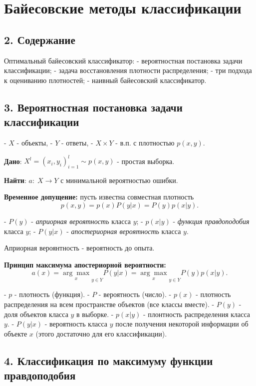 \section{Байесовские методы классификации}

\subsection{2. Содержание}

Оптимальный байесовский классификатор:
- вероятностная постановка задачи классификации;
- задача восстановления плотности распределения;
- три подхода к оцениванию плотностей;
- наивный байесовский классификатор.

\subsection{3. Вероятностная постановка задачи классификации}

- $X$ - объекты,
- $Y$ - ответы,
- $X \times Y$ - в.п. с плотностью $p{(x, y)}$.

\textbf{Дано}: $X^l = {(x_i, y_i)}_{i=1}^{l} \sim p{(x, y)}$ - простая
выборка.

\textbf{Найти}: $a: \; X \rightarrow Y$ с минимальной вероятностью ошибки.

\textbf{Временное допущение:} пусть известна совместная плотность
$$p{(x, y)} = p{(x)} P{(y \vert x)} = P{(y)} p{(x \vert y)}.$$

- $P{(y)}$ - \textit{априорная вероятность} класса $y$;
- $p{(x \vert y)}$ - \textit{функция правдоподобия} класса $y$;
- $P{(y \vert x)}$ - \textit{апостериорная вероятность} класса $y$.

Априорная вероянтность - вероятность до опыта.

\textbf{Принцип максимума апостериорной вероятности:}
$$a{(x)} = {\underset{x}{\arg\max}}_{y \in Y}{P{(y \vert x)}} = {\underset{x}{\arg\max}}_{y \in Y}{P{(y)} p{(x \vert y)}}.$$

- $p$ - плотность (функция).
- $P$ - вероятность (число).
- $p{(x)}$ - плотность распределения на всем пространстве объектов
(все классы вместе).
- $P{(y)}$ - доля объектов класса $y$ в выборке.
- $p{(x \vert y)}$ - плонтность распределения класса $y$.
- $P{(y \vert x)}$ - вероятность класса $y$ после получения некоторой
информации об объекте $x$ (этого достаточно для его классификации).

\subsection{4. Классификация по максимуму функции правдоподобия}

